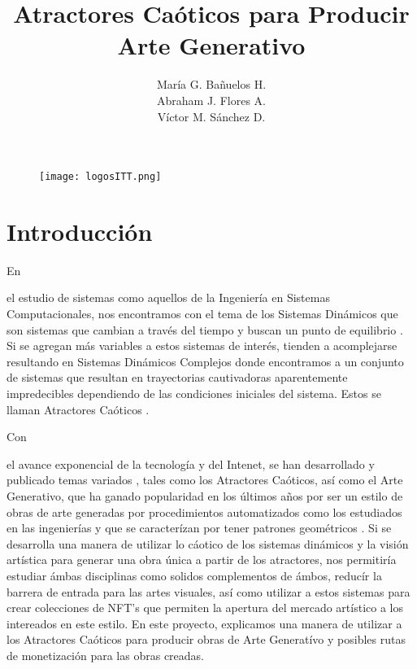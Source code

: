 \documentclass[stu, 12pt, letterpaper, donotrepeattitle, floatsintext]{apa7}
\title{\Large Atractores Caóticos para Producir Arte Generativo}
\author{María G. Bañuelos H.\: 19211640 \\
  Abraham J. Flores A.\: 19211640 \\
  Víctor M. Sánchez D.\: 19211732} %
\affiliation{Tecnológico Nacional de México | Instituto Tecnológico de Tijuana}
\begin{document}
    \begin{figure}[ht]
      \centering
      \texttt{[image: logosITT.png]}
    \end{figure}
    \maketitle

    \tableofcontents 
    \listoffigures

    \newpage
    \section*{Introducción}
    En \begin{justifying}
      el estudio de sistemas como aquellos de la Ingeniería en Sistemas Computacionales, nos encontramos con el tema
    de los Sistemas Dinámicos que son sistemas que cambian a través del tiempo \cite{Meiss:2007} y buscan un punto de equilibrio \cite{unknown-author-2020}. Si se agregan
    más variables a estos sistemas de interés, tienden a acomplejarse resultando en Sistemas Dinámicos Complejos donde encontramos
    a un conjunto de sistemas que resultan en trayectorias cautivadoras aparentemente impredecibles dependiendo de las condiciones iniciales del sistema.
    Estos se llaman Atractores Caóticos \cite{bradley-2010}.\par
    \end{justifying}
    Con \begin{justifying}
      el avance exponencial de la tecnología y del Intenet, se han desarrollado y publicado temas variados \cite{kemp-2017}, tales como los Atractores Caóticos, así como
    el Arte Generativo, que ha ganado popularidad en los últimos años por ser un estilo de obras de arte generadas por procedimientos automatizados como los estudiados
    en las ingenierías y que se caracterízan por tener patrones geométricos \cite{unknown-author-no-date}\cite{lamine-2021}. Si se desarrolla una manera de utilizar lo cáotico de los sistemas dinámicos y 
    la visión artística para generar una obra única a partir de los atractores, nos permitiría estudiar ámbas disciplinas como solidos complementos de ámbos, reducír la barrera de entrada
    para las artes visuales, así como utilizar a estos sistemas para crear colecciones de NFT's que permiten la apertura del mercado artístico a los intereados en este estilo. En este proyecto, explicamos una
    manera de utilizar a los Atractores Caóticos para producir obras de Arte Generatívo y posibles rutas de monetización para las obras creadas.\par
    \end{justifying}
    \vspace{\baselineskip}
\end{document}
